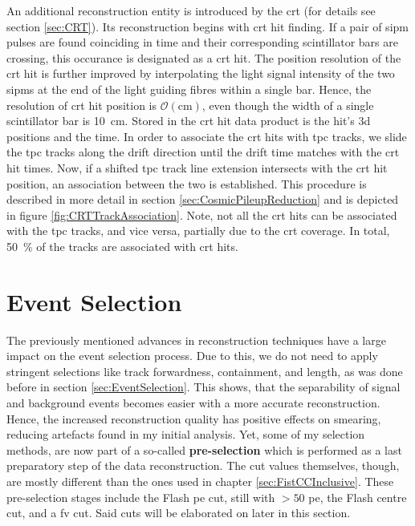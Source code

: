 An additional reconstruction entity is introduced by the \gls{crt} (for details see section \ref{sec:CRT}). Its reconstruction begins with \gls{crt} hit finding. If a pair of \gls{sipm} pulses are found coinciding in time and their corresponding scintillator bars are crossing, this occurance is designated as a \gls{crt} hit. The position resolution of the \gls{crt} hit is further improved by interpolating the light signal intensity of the two \glspl{sipm} at the end of the light guiding fibres within a single bar. Hence, the resolution of \gls{crt} hit position is $\mathcal{O}(\si{\centi\metre})$, even though the width of a single scintillator bar is \SI{10}{\centi\metre}. Stored in the \gls{crt} hit data product is the hit's \gls{3d} positions and the time. In order to associate the \gls{crt} hits with \gls{tpc} tracks, we slide the \gls{tpc} tracks along the drift direction until the drift time matches with the \gls{crt} hit times. Now, if a shifted \gls{tpc} track line extension intersects with the \gls{crt} hit position, an association between the two is established. This procedure is described in more detail in section \ref{sec:CosmicPileupReduction} and is depicted in figure \ref{fig:CRTTrackAssociation}. Note, not all the \gls{crt} hits can be associated with the \gls{tpc} tracks, and vice versa, partially due to the \gls{crt} coverage. In total, \SI{50}{\percent} of the tracks are associated with \gls{crt} hits.

\section{Event Selection} \label{sec:NewEventSelection}
The previously mentioned advances in reconstruction techniques have a large impact on the event selection process. Due to this, we do not need to apply stringent selections like track forwardness, containment, and length, as was done before in section \ref{sec:EventSelection}. This shows, that the separability of signal and background events becomes easier with a more accurate reconstruction. Hence, the increased reconstruction quality has positive effects on smearing, reducing artefacts found in my initial analysis. Yet, some of my selection methods, are now part of a so-called \textbf{pre-selection} which is performed as a last preparatory step of the data reconstruction. The cut values themselves, though, are mostly different than the ones used in chapter \ref{sec:FistCCInclusive}. These pre-selection stages include the \gls{Flash} \gls{pe} cut, still with $> \num{50}$ \gls{pe}, the \gls{Flash} centre cut, and a \gls{fv} cut. Said cuts will be elaborated on later in this section.

